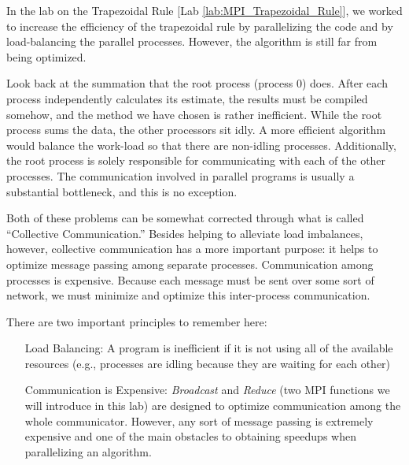 \label{lab:MPI_Collective_Communication}

In the lab on the Trapezoidal Rule [Lab \ref{lab:MPI_Trapezoidal_Rule}], we worked to increase the efficiency of the trapezoidal rule by parallelizing the code and by load-balancing the parallel processes. However, the algorithm is still far from being optimized.

Look back at the summation that the root process (process 0) does. After each process independently calculates its estimate, the results must be compiled somehow, and the method we have chosen is rather inefficient. While the root process sums the data, the other processors sit idly. A more efficient algorithm would balance the work-load so that there are non-idling processes. Additionally, the root process is solely responsible for communicating with each of the other processes. The communication involved in parallel programs is usually a substantial bottleneck, and this is no exception. 

Both of these problems can be somewhat corrected through what is called ``Collective Communication.'' Besides helping to alleviate load imbalances, however, collective communication has a more important purpose: it helps to optimize message passing among separate processes. Communication among processes is expensive. Because each message must be sent over some sort of network, we must minimize and optimize this inter-process communication.

There are two important principles to remember here:
\begin{enumerate}
\item[Load Balancing:]
A program is inefficient if it is not using all of the available resources (e.g., processes are idling because they are waiting for each other)
\item[Communication is Expensive:]
\emph{Broadcast} and \emph{Reduce} (two MPI functions we will introduce in this lab) are designed to optimize communication among the whole communicator. However, any sort of message passing is extremely expensive and one of the main obstacles to obtaining speedups when parallelizing an algorithm.
\end{enumerate}


